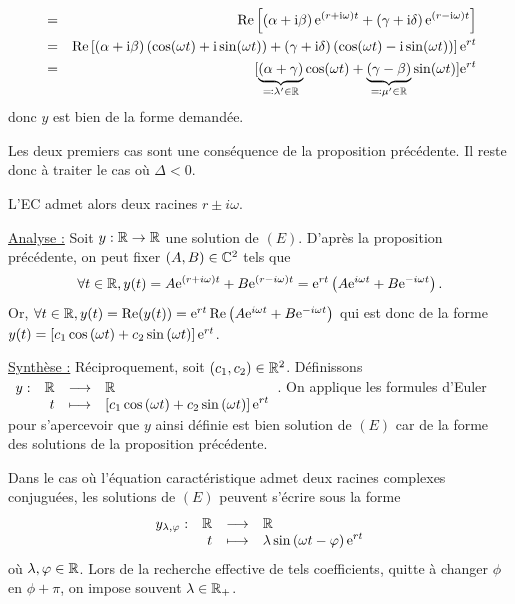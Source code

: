 \documentclass{magnolia}
\begin{document}
\begin{preuve}
\begin{francois}
\begin{itemize}
\begin{itemize}
\begin{eqnarray*}
&=& \mathop{\rm Re}\left[\left(\alpha+{\rm i}\beta\right){\rm e}^{(r+{\rm i}\omega)t}+\left(\gamma+{\rm i}\delta\right){\rm e}^{(r-{\rm i}\omega)t}\right]\\
&=& \mathop{\rm Re}\left[\left(\alpha+{\rm i}\beta\right)\left(\cos(\omega t)+{\rm i}\sin(\omega t)\right)+\left(\gamma+{\rm i}\delta\right)\left(\cos(\omega t)-{\rm i}\sin(\omega t)\right)\right]{\rm e}^{rt}\\
&=& [\underbrace{(\alpha+\gamma)}_{\eqqcolon \lambda'\in\mathbb{R}}\cos(\omega t)+\underbrace{(\gamma-\beta)}_{\eqqcolon \mu'\in\mathbb{R}}\sin(\omega t)]{\rm e}^{rt}
\end{eqnarray*}
donc $y$ est bien de la forme demandée.
\end{itemize}
\end{itemize}
\end{francois}
\begin{victor}
Les deux premiers cas sont une conséquence de la proposition précédente. Il reste donc à traiter le cas où $\Delta<0$.

L'EC admet alors deux racines $r\pm i\omega$. 

\underline{Analyse :} Soit $y:\mathbb{R}\to\mathbb{R}$ une solution de $(E)$. D'après la proposition précédente, on peut fixer $(A,B)\in \mathbb{C}^2$ tels que \[\forall t\in\mathbb{R}, y(t)=A{\rm e}^{(r+i\omega)t}+B{\rm e}^{(r-i\omega)t}={\rm e}^{rt}\left(A{\rm e}^{i\omega t}+B{\rm e}^{-i\omega t}\right).\]
Or, $\forall t\in\mathbb{R}, y(t)=\mathop{\rm Re}(y(t))={\rm e}^{rt}\mathop{\rm Re}\left(A{\rm e}^{i\omega t}+B{\rm e}^{-i\omega t}\right)$ qui est donc de la forme $y(t)=\left[c_1\cos\left(\omega t\right)+c_2\sin\left(\omega t\right)\right]{\rm e}^{r t}$.

\underline{Synthèse :} Réciproquement, soit $(c_1,c_2)\in\mathbb{R}^2$. Définissons $\begin{array}[t]{lrcl} \displaystyle{y} : & \displaystyle{\mathbb{R}} & \longrightarrow & \displaystyle{\mathbb{R}} \\ & \displaystyle{t} & \longmapsto & \displaystyle{\left[c_1\cos\left(\omega t\right)+c_2\sin\left(\omega t\right)\right]{\rm e}^{r t}} \end{array}$.
On applique les formules d'Euler pour s'apercevoir que $y$ ainsi définie est bien solution de $(E)$ car de la forme des solutions de la proposition précédente.
\end{victor}
\end{preuve}

\begin{remarqueUnique}
\remarque Dans le cas où l'équation caractéristique admet deux racines complexes
  conjuguées, les solutions de $(E)$ peuvent s'écrire sous la forme
  \[\begin{array}[t]{lrcl} \displaystyle{y_{\lambda,\varphi}} : & \displaystyle{\mathbb{R}} & \longrightarrow & \displaystyle{\mathbb{R}} \\ & \displaystyle{t} & \longmapsto & \displaystyle{\lambda \sin\left(\omega t-\varphi\right){\rm e}^{r t}} \end{array}\]
  où $\lambda,\varphi\in\mathbb{R}$. Lors de la recherche effective de tels coefficients, 
  quitte à changer $\phi$ en $\phi+\pi$, on impose souvent $\lambda\in\mathbb{R}_+$.
\end{remarqueUnique}
\end{document}
